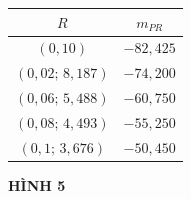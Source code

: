 \noindent
\begin{minipage}[t]{0.28\textwidth}
    \vspace*{80pt}
    
    \centering
    {\footnotesize
    \setlength{\tabcolsep}{4.5pt}
    \renewcommand{\arraystretch}{1.2}
    \begin{tabular}{|c|c|}
    \hline
    \rowcolor{tableheadercolor}
    $R$ & $m_{PR}$ \\
    \hline
    $(0, 10)$ & $-82{,}425$ \\
    $(0{,}02;\, 8{,}187)$ & $-74{,}200$ \\
    $(0{,}06;\, 5{,}488)$ & $-60{,}750$ \\
    $(0{,}08;\, 4{,}493)$ & $-55{,}250$ \\
    $(0{,}1;\, 3{,}676)$ & $-50{,}450$ \\
    \hline
    \end{tabular}
    }

    \vspace{155pt}

    \raggedright
    \noindent\textbf{\textsf{HÌNH 5}}

    \vspace{16pt}


\end{minipage}%
\hfill
